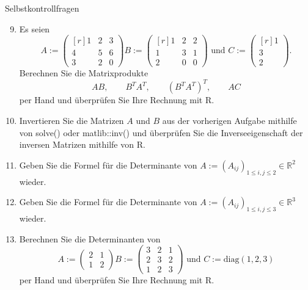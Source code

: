 \documentclass[
  8pt,
  ignorenonframetext,
]{beamer}
\begin{document}
\begin{frame}{Selbstkontrollfragen}
\protect\hypertarget{selbstkontrollfragen-1}{}
\footnotesize
\begin{enumerate}
\setcounter{enumi}{8}
\item Es seien
\begin{equation}
A :=
\begin{pmatrix*}[r]
1 & 2 & 3 \\
4 & 5 & 6 \\
3 & 2 & 0
\end{pmatrix*}
B :=
\begin{pmatrix*}[r]
1 & 2 & 2 \\
1 & 3 & 1 \\
2 & 0 & 0
\end{pmatrix*}
\mbox{ und }
C :=
\begin{pmatrix*}[r]
1 \\ 3 \\ 2
\end{pmatrix*}.
\end{equation}
Berechnen Sie die Matrixprodukte
\begin{equation}
AB , \quad\quad
B^TA^T, \quad\quad
\left(B^TA^T\right)^T, \quad\quad
AC
\end{equation}
per Hand und überprüfen Sie Ihre Rechnung mit R.



\item Invertieren Sie die Matrizen $A$ und $B$ aus der vorherigen Aufgabe mithilfe
von solve() oder matlib::inv()  und überprüfen Sie die Inverseeigenschaft der
inversen Matrizen mithilfe von R.



\item Geben Sie die Formel für die Determinante von $A := (A_{ij})_{1 \le i,j \le 2} \in \mathbb{R}^2$ wieder.
\item Geben Sie die Formel für die Determinante von $A := (A_{ij})_{1 \le i,j \le 3} \in \mathbb{R}^3$ wieder.
\item Berechnen Sie die Determinanten von
\begin{equation}
A := \begin{pmatrix} 2 & 1 \\ 1 & 2 \end{pmatrix}
B := \begin{pmatrix} 3 & 2 & 1 \\ 2 & 3 & 2 \\ 1 & 2 & 3 \end{pmatrix} \mbox{ und }
C := \mbox{diag}(1,2,3)
\end{equation}
per Hand und überprüfen Sie Ihre Rechnung mit R.
\end{enumerate}
\end{frame}
\end{document}
